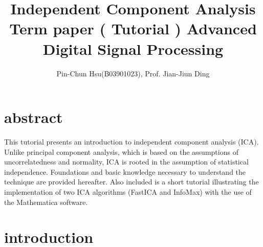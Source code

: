 \documentclass[12pt, a4paper, onecolumn]{IEEEtran}
\title{%
    Independent Component Analysis \\
  \large Term paper ( Tutorial ) Advanced Digital Signal Processing }
\author{Pin-Chun Hsu(B03901023), Prof. Jian-Jiun Ding}
\begin{document}
\maketitle
\section{abstract}
This tutorial presents an introduction to independent component analysis (ICA). Unlike principal component analysis, which is based on the assumptions of uncorrelatedness and  normality,  ICA  is  rooted  in  the  assumption  of  statistical  independence. Foundations and basic knowledge necessary to understand the technique are provided hereafter. Also included is a short  tutorial illustrating the implementation of two ICA algorithms (FastICA and InfoMax) with the use of the Mathematica software.
\section{introduction}
\end{document}
